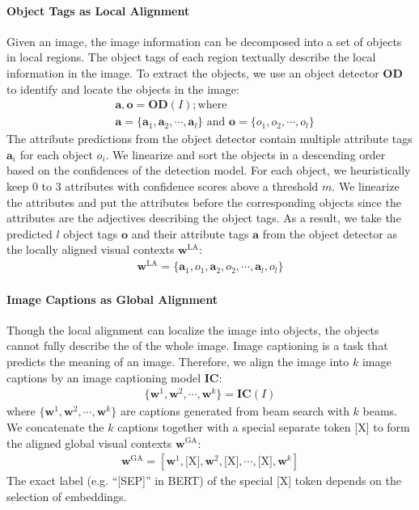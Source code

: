 \documentclass[11pt]{article}
\def\va{{\bm{a}}}
\def\vo{{\bm{o}}}
\def\vw{{\bm{w}}}
\def\evo{{o}}
\begin{document}
\paragraph{Object Tags as Local Alignment} Given an image, the image information can be decomposed into a set of objects in local regions. The object tags of each region textually describe the local information in the image. To extract the objects, we use an object detector $\textbf{OD}$ to identify and locate the objects in the image: 
\begin{align}
&\va, \vo = \textbf{OD}(I); \text{where }  \nonumber\\
&\va = \{\va_1,\va_2,\cdots,\va_l\} \text{ and } \vo = \{\evo_1,\evo_2,\cdots,\evo_l\} \nonumber
\end{align}
The attribute predictions from the object detector contain multiple attribute tags $\va_i$ for each object $\evo_i$. We linearize and sort the objects in a descending order based on the confidences of the detection model. For each object, we heuristically keep 0 to 3 attributes with confidence scores above a threshold $m$. We linearize the attributes and put the attributes before the corresponding objects since the attributes are the adjectives describing the object tags. 
As a result, we take the predicted $l$ object tags $\vo$ and their attribute tags $\va$ from the object detector as the locally aligned visual contexts $\vw^{\text{LA}}$:
\begin{align}
\vw^{\text{LA}} = \{\va_1,\evo_1,\va_2,\evo_2,\cdots,\va_l,\evo_l\}\nonumber
\end{align}


\paragraph{Image Captions as Global Alignment} Though the local alignment can localize the image into objects, the objects cannot fully describe the of the whole image. Image captioning is a task that predicts the meaning of an image. Therefore, we align the image into $k$ image captions by an image captioning model $\textbf{IC}$:
\begin{align}
\{\vw^1,\vw^2,\cdots,\vw^k\} = \textbf{IC}(I) \nonumber
\end{align}
where $\{\vw^1,\vw^2,\cdots,\vw^k\}$ are captions generated from beam search with $k$ beams. We concatenate the $k$ captions together with a special separate token [X] to form the aligned global visual contexts $\vw^{\text{GA}}$:
\begin{align}
 \vw^{\text{GA}}  {=} [\vw^1,\text{[X]},\vw^2,\text{[X]},\cdots,\text{[X]},\vw^k] \nonumber
\end{align}
The exact label (e.g. ``[SEP]'' in BERT) of the special [X] token depends on the selection of embeddings.
\end{document}
